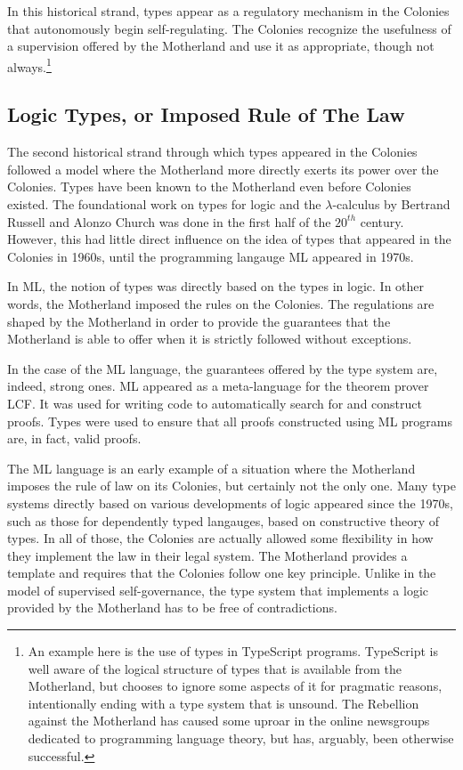 \documentclass[]{article}
\begin{document}
In this historical strand, types appear as a regulatory mechanism in the Colonies that autonomously begin self-regulating. The Colonies recognize the usefulness of a supervision offered by the Motherland and use it as appropriate, though not always.\footnote{An example here is the use of types in TypeScript programs. TypeScript is well aware of the logical structure of types that is available from the Motherland, but chooses to ignore some aspects of it for pragmatic reasons, intentionally ending with a type system that is unsound. The Rebellion against the Motherland has caused some uproar in the online newsgroups dedicated to programming language theory, but has, arguably, been otherwise successful.}

\subsection{Logic Types, or Imposed Rule of The Law}

The second historical strand through which types appeared in the Colonies followed a model where the Motherland more directly exerts its power over the Colonies. Types have been known to the Motherland even before Colonies existed. The foundational work on types for logic and the $\lambda$-calculus by Bertrand Russell and Alonzo Church was done in the first half of the $20^{th}$ century. However, this had little direct influence on the idea of types that appeared in the Colonies in 1960s, until the programming langauge ML appeared in 1970s.

In ML, the notion of types was directly based on the types in logic. In other words, the Motherland imposed the rules on the Colonies. The regulations are shaped by the Motherland in order to provide the guarantees that the Motherland is able to offer when it is strictly followed without exceptions.

In the case of the ML language, the guarantees offered by the type system are, indeed, strong ones. ML appeared as a meta-language for the theorem prover LCF. It was used for writing code to automatically search for and construct proofs. Types were used to ensure that all proofs constructed using ML programs are, in fact, valid proofs.

The ML language is an early example of a situation where the Motherland imposes the rule of law on its Colonies, but certainly not the only one. Many type systems directly based on various developments of logic appeared since the 1970s, such as those for dependently typed langauges, based on constructive theory of types. In all of those, the Colonies are actually allowed some flexibility in how they implement the law in their legal system. The Motherland provides a template and requires that the Colonies follow one key principle. Unlike in the model of supervised self-governance, the type system that implements a logic provided by the Motherland has to be free of contradictions.
\end{document}
